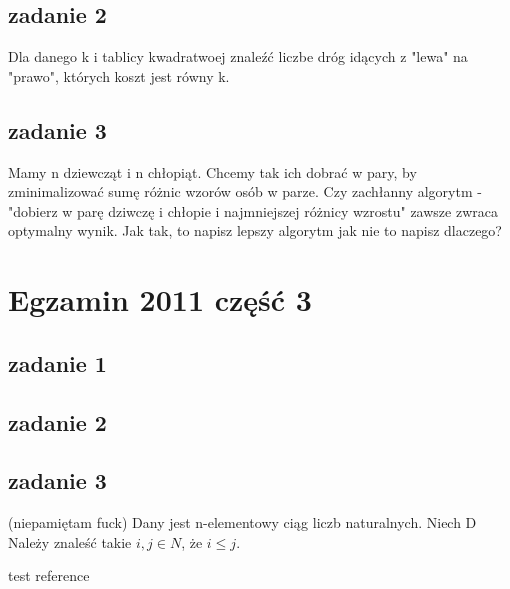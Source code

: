 \documentclass[svgnames]{report}
\begin{document}
\section{zadanie 2}
Dla danego k i tablicy kwadratwoej znaleźć liczbe dróg idących z "lewa" na "prawo", których koszt jest równy k.

\section{zadanie 3}
Mamy n dziewcząt i n chłopiąt. Chcemy tak ich dobrać w pary, by zminimalizować sumę różnic wzorów osób w parze.
Czy zachłanny algorytm - "dobierz w parę dziwczę i chłopie i najmniejszej różnicy wzrostu" zawsze zwraca optymalny wynik.
Jak tak, to napisz lepszy algorytm jak nie to napisz dlaczego?

\chapter{Egzamin 2011 część 3}

\section{zadanie 1}

\section{zadanie 2}

\section{zadanie 3} (niepamiętam fuck)
Dany jest n-elementowy ciąg liczb naturalnych. 
Niech D
Należy znaleść takie $i,j \in N$, że $i \leqslant j$.



\begin{thebibliography}{99}
 test reference
\end{thebibliography}
\end{document}
